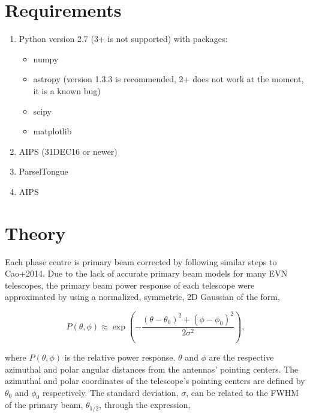 \documentclass[idxtotoc,hyperref,openany]{article} %
\begin{document}

\section{Requirements}

\begin{enumerate}[topsep=0pt,itemsep=-1ex,partopsep=1ex,parsep=1ex]
	\item Python version 2.7 (3+ is not supported) with packages:
	\begin{itemize}[topsep=0pt,itemsep=-1ex,partopsep=1ex,parsep=1ex]
		\item numpy
		\item astropy (version 1.3.3 is recommended, 2+ does not work at the moment, it is a known bug)
		\item scipy
		\item matplotlib
	\end{itemize}
	\item AIPS (31DEC16 or newer)
	\item ParselTongue 
	\item AIPS
\end{enumerate}


\section{Theory}

Each phase centre is primary beam corrected by following similar steps to Cao+2014. Due to the lack of accurate primary beam models for many EVN telescopes, the primary beam power response of each telescope were approximated by using a normalized, symmetric, 2D Gaussian of the form,

\begin{equation}
P(\theta, \phi) \approx \exp\left({-\frac{(\theta- \theta_0)^2 + (\phi - \phi_0)^{2}}{2\sigma^2}}\right),
\end{equation}

\noindent where $P(\theta,\phi)$ is the relative power response. $\theta$ and $\phi$ are the respective azimuthal and polar angular distances from the antennas' pointing centers. The azimuthal and polar coordinates of the telescope's pointing centers are defined by $\theta_0$ and $\phi_0$ respectively. The standard deviation, $\sigma$, can be related to the FWHM of the primary beam, $\theta_{1/2}$, through the expression,
\end{document}
